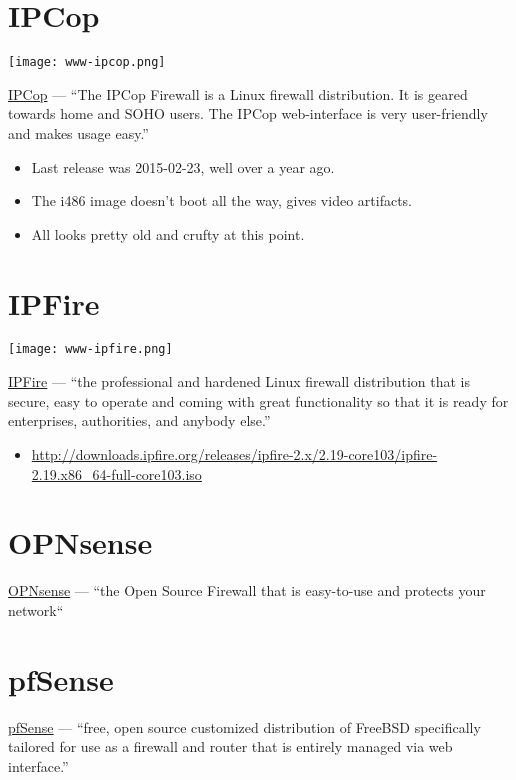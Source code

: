 \section{IPCop}
\texttt{[image: www-ipcop.png]}

 \href{http://www.ipcop.org/}{IPCop} --- ``The IPCop Firewall is a Linux firewall distribution. It is geared towards home and SOHO users. The IPCop web-interface is very user-friendly and makes usage easy.''

\begin{itemize}
 \item Last release was 2015-02-23, well over a year ago.
 \item The i486 image doesn't boot all the way, gives video artifacts.
 \item All looks pretty old and crufty at this point.
\end{itemize}


\section{IPFire}
\texttt{[image: www-ipfire.png]}

 \href{http://www.ipfire.org/}{IPFire} --- ``the professional and hardened Linux firewall distribution that is secure, easy to operate and coming with great functionality so that it is ready for enterprises, authorities, and anybody else.''

\begin{itemize}
 \item \url{http://downloads.ipfire.org/releases/ipfire-2.x/2.19-core103/ipfire-2.19.x86_64-full-core103.iso}
\end{itemize}


\section{OPNsense}
 \href{https://opnsense.org/}{OPNsense} --- ``the Open Source Firewall that is easy-to-use and protects your network``


\section{pfSense}
 \href{https://www.pfsense.org/}{pfSense} --- ``free, open source customized distribution of FreeBSD specifically tailored for use as a firewall and router that is entirely managed via web interface.''


